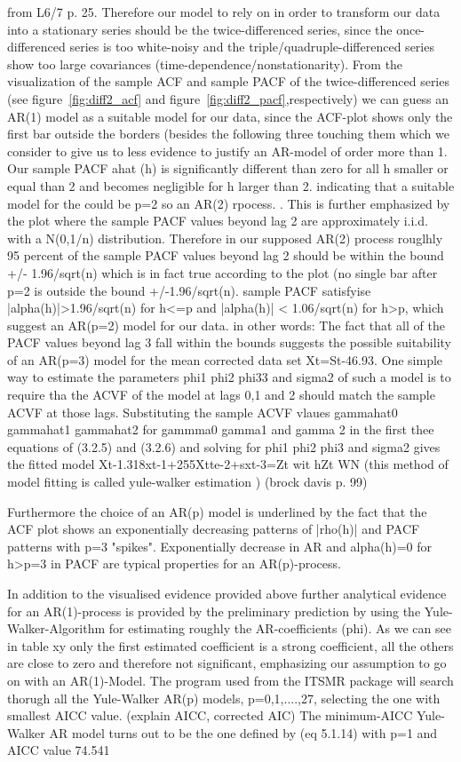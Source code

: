 \documentclass[11pt,a4paper]{article}
\begin{document}
from L6/7 p. 25. 
Therefore our model to rely on in order to transform our data into a stationary series should be the twice-differenced series, since the once-differenced series is too white-noisy and the triple/quadruple-differenced series show too large covariances (time-dependence/nonstationarity). From the visualization of the sample ACF and sample PACF of the twice-differenced series (see figure~\ref{fig:diff2_acf} and figure~\ref{fig:diff2_pacf},respectively) we can guess an AR(1) model as a suitable model for our data, since the ACF-plot shows only the first bar outside the borders (besides the following three touching them which we consider to give us to less evidence to justify an AR-model of order more than 1.
Our sample PACF ahat (h) is significantly different than zero for all h smaller or equal than 2 and becomes negligible for h larger than 2. indicating that a suitable model for the could be p=2 so an AR(2) rpocess. . This is further emphasized by the plot where the sample PACF values beyond lag 2 are approximately i.i.d. with a N(0,1/n) distribution. Therefore in our supposed AR(2) process rouglhly 95 percent of the sample PACF values beyond lag 2 should be within the bound +/- 1.96/sqrt(n) which is in fact true according to the plot (no single bar after p=2 is outside the bound +/-1.96/sqrt(n). sample PACF satisfyise |alpha(h)|>1.96/sqrt(n) for h<=p and |alpha(h)| < 1.06/sqrt(n) for h>p, which suggest an AR(p=2) model for our data.
in other words: The fact that all of the PACF values beyond lag 3 fall within the bounds suggests the possible suitability of an AR(p=3) model for the mean corrected data set Xt=St-46.93. One simple way to estimate the parameters phi1 phi2 phi33 and sigma2 of such a model is to require tha the ACVF of the model at lags 0,1 and 2 should match the sample ACVF at those lags. Substituting the sample ACVF vlaues gammahat0 gammahat1 gammahat2 for gammma0 gamma1 and gamma 2 in the first thee equations of (3.2.5) and (3.2.6) and solving for phi1 phi2 phi3 and sigma2 gives the fitted model Xt-1.318xt-1+255Xtte-2+sxt-3=Zt wit hZt  WN (this method of model fitting is called yule-walker estimation ) (brock davis p. 99)

Furthermore the choice of an AR(p) model is underlined by the fact that the ACF plot shows an exponentially decreasing patterns of |rho(h)| and PACF patterns with p=3 "spikes". Exponentially decrease in AR and alpha(h)=0 for h>p=3 in PACF are typical properties for an AR(p)-process.

In addition to the visualised evidence provided above further analytical evidence for an AR(1)-process is provided by the preliminary prediction by using the Yule-Walker-Algorithm for estimating roughly the AR-coefficients (phi). As we can see in table xy only the first estimated coefficient is a strong coefficient, all the others are close to zero and therefore not significant, emphasizing our assumption to go on with an AR(1)-Model.
The program used from the ITSMR package will search thorugh all the Yule-Walker AR(p) models, p=0,1,....,27, selecting the one with smallest AICC value. (explain AICC, corrected AIC) The minimum-AICC Yule-Walker AR model turns out to be the one defined by (eq 5.1.14) with p=1 and AICC value 74.541
\end{document}
